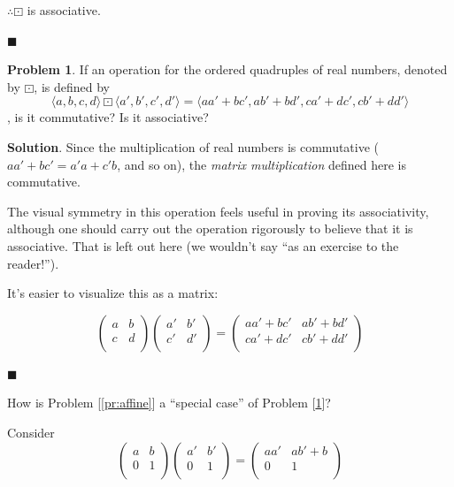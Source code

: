 \documentclass[english,notitlepage,smartquotes]{hgbreport}
\theoremstyle{definition}
\theoremstyle{problem}
\newtheorem{problem}{Problem}
\theoremstyle{remark}
\theoremstyle{plain}
\renewcommand\qedsymbol{$\blacksquare$}
\begin{document}
$\therefore \boxdot$ is associative.

\qedsymbol

\begin{problem}
\label{pr:mmult}
If an operation for the ordered quadruples of real numbers, denoted by $\boxdot$, is defined by
$$
\langle a,b,c,d\rangle\boxdot\langle a',b',c',d'\rangle=\langle aa'+bc',ab'+bd',ca'+dc',cb'+dd'\rangle
$$
, is it commutative? Is it associative?
\end{problem}

\textbf{Solution}.
Since the multiplication of real numbers is commutative ($aa'+bc'=a'a+c'b$, and so on), the \textit{matrix multiplication} defined here is commutative.

The visual symmetry in this operation feels useful in proving its associativity, although one should carry out the operation rigorously to believe that it is associative. That is left out here (we wouldn't say ``as an exercise to the reader!'').

It's easier to visualize this as a matrix:

\[
  \begin{pmatrix}
    a & b\\
    c & d\\
  \end{pmatrix}
  \begin{pmatrix}
    a' & b'\\
    c' & d'\\
  \end{pmatrix}
  =
  \begin{pmatrix}
    aa'+bc' & ab'+bd'\\
    ca'+dc' & cb'+dd'\\
  \end{pmatrix}
\]

\qedsymbol

How is Problem [\ref{pr:affine}] a ``special case'' of Problem [\ref{pr:mmult}]?

Consider
\[
  \begin{pmatrix}
    a & b\\
    0 & 1\\
  \end{pmatrix}
  \begin{pmatrix}
    a' & b'\\
    0 & 1\\
  \end{pmatrix}
  =
  \begin{pmatrix}
    aa' & ab'+b\\
    0 & 1\\
  \end{pmatrix}
\]
\end{document}
